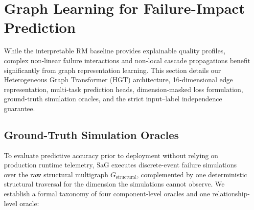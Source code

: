 \section{Graph Learning for Failure-Impact Prediction}
\label{sec:5}

While the interpretable RM baseline provides explainable quality profiles, complex non-linear failure interactions and non-local cascade propagations benefit significantly from graph representation learning. This section details our Heterogeneous Graph Transformer (HGT) architecture, 16-dimensional edge representation, multi-task prediction heads, dimension-masked loss formulation, ground-truth simulation oracles, and the strict input--label independence guarantee.

\subsection{Ground-Truth Simulation Oracles}
\label{sec:5.1}

To evaluate predictive accuracy prior to deployment without relying on production runtime telemetry, SaG executes discrete-event failure simulations over the raw structural multigraph $G_{\text{structural}}$, complemented by one deterministic structural traversal for the dimension the simulations cannot observe. We establish a formal taxonomy of four component-level oracles and one relationship-level oracle:

